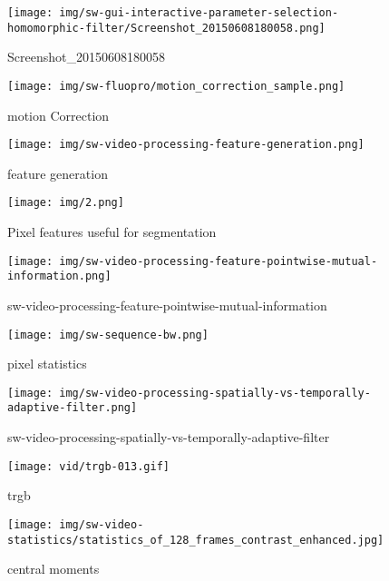 \documentclass[
  12pt,
  lettersizepaper,
]{book}
\begin{document}
\begin{figure}
\centering
\texttt{[image: img/sw-gui-interactive-parameter-selection-homomorphic-filter/Screenshot\_20150608180058.png]}
\caption{Screenshot\_20150608180058}
\end{figure}

\begin{figure}
\centering
\texttt{[image: img/sw-fluopro/motion\_correction\_sample.png]}
\caption{motion Correction}
\end{figure}

\begin{figure}
\centering
\texttt{[image: img/sw-video-processing-feature-generation.png]}
\caption{feature generation}
\end{figure}

\begin{figure}
\centering
\texttt{[image: img/2.png]}
\caption{Pixel features useful for segmentation}
\end{figure}

\begin{figure}
\centering
\texttt{[image: img/sw-video-processing-feature-pointwise-mutual-information.png]}
\caption{sw-video-processing-feature-pointwise-mutual-information}
\end{figure}

\begin{figure}
\centering
\texttt{[image: img/sw-sequence-bw.png]}
\caption{pixel statistics}
\end{figure}

\begin{figure}
\centering
\texttt{[image: img/sw-video-processing-spatially-vs-temporally-adaptive-filter.png]}
\caption{sw-video-processing-spatially-vs-temporally-adaptive-filter}
\end{figure}

\begin{figure}
\centering
\texttt{[image: vid/trgb-013.gif]}
\caption{trgb}
\end{figure}

\begin{figure}
\centering
\texttt{[image: img/sw-video-statistics/statistics\_of\_128\_frames\_contrast\_enhanced.jpg]}
\caption{central moments}
\end{figure}
\end{document}

